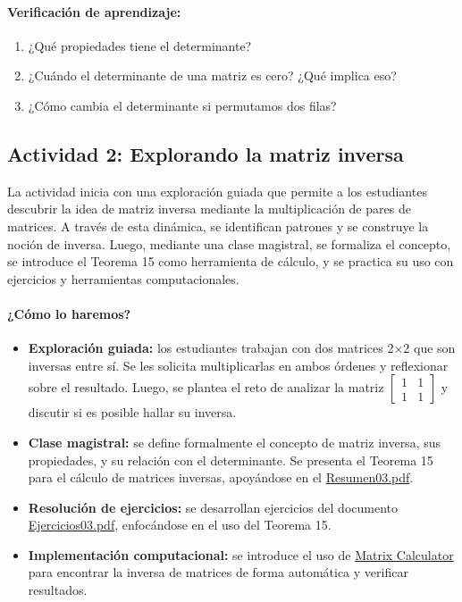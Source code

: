 \documentclass[a4,11pt]{aleph-notas}
\begin{document}
\paragraph{Verificación de aprendizaje:}  
\begin{enumerate}[leftmargin=*]  
    \item ¿Qué propiedades tiene el determinante?
    \item ¿Cuándo el determinante de una matriz es cero? ¿Qué implica eso?
    \item ¿Cómo cambia el determinante si permutamos dos filas?
\end{enumerate}  


\subsection*{Actividad 2: Explorando la matriz inversa}  

La actividad inicia con una exploración guiada que permite a los estudiantes descubrir la idea de matriz inversa mediante la multiplicación de pares de matrices. A través de esta dinámica, se identifican patrones y se construye la noción de inversa. Luego, mediante una clase magistral, se formaliza el concepto, se introduce el Teorema 15 como herramienta de cálculo, y se practica su uso con ejercicios y herramientas computacionales.

\paragraph{¿Cómo lo haremos?}  
\begin{itemize}[leftmargin=*]  
    \item \textbf{Exploración guiada:} los estudiantes trabajan con dos matrices 2×2 que son inversas entre sí. Se les solicita multiplicarlas en ambos órdenes y reflexionar sobre el resultado. Luego, se plantea el reto de analizar la matriz $\begin{bmatrix}1 & 1\\1 & 1\end{bmatrix}$ y discutir si es posible hallar su inversa.  
    \item \textbf{Clase magistral:} se define formalmente el concepto de matriz inversa, sus propiedades, y su relación con el determinante. Se presenta el Teorema 15 para el cálculo de matrices inversas, apoyándose en el \href{https://fcena-puce.github.io/AlgLinealyGeomAnalitica-05-N0068/2-Resumenes/Resumen03.pdf}{Resumen03.pdf}.  
    \item \textbf{Resolución de ejercicios:} se desarrollan ejercicios del documento \href{https://fcena-puce.github.io/AlgLinealyGeomAnalitica-05-N0068/2-Ejercicios/Ejercicios03.pdf}{Ejercicios03.pdf}, enfocándose en el uso del Teorema 15.  
    \item \textbf{Implementación computacional:} se introduce el uso de \href{https://matrixcalc.org/es/slu.html}{Matrix Calculator} para encontrar la inversa de matrices de forma automática y verificar resultados.  
\end{itemize}  
\end{document}
